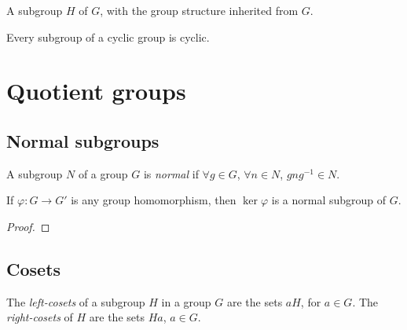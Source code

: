 \begin{definition}
  \label{def:groups:subgroup-to-group}
  \leanok
  A subgroup $H$ of $G$, with the group structure inherited from $G$.
\end{definition}

\begin{proposition}
  \label{prop:groups:subgroup-of-cyclic-is-cyclic}
  Every subgroup of a cyclic group is cyclic.
\end{proposition}

\section{Quotient groups}
\label{sec:groups:quotient-groups}

\subsection{Normal subgroups}
\label{subsec:groups:normal-subgroups}

\begin{definition}
  \label{def:groups:normal-subgroup}
  \leanok
  A subgroup $N$ of a group $G$ is \emph{normal} if $\forall g \in G$,
  $\forall n \in N$, $gng^{-1} \in N$.
\end{definition}

\begin{proposition}
  \label{prop:groups:kernel-is-normal}
  If $\varphi : G \to G'$ is any group homomorphism, then
  $\ker\varphi$ is a normal subgroup of $G$.
\end{proposition}
\begin{proof}
\end{proof}

\subsection{Cosets}
\label{subsec:groups:cosets}

\begin{definition}
  \label{def:groups:cosets}
  \leanok
  The \emph{left-cosets} of a subgroup $H$ in a group $G$ are the sets
  $aH$, for $a \in G$. The \emph{right-cosets} of $H$ are the sets
  $Ha$, $a \in G$.
\end{definition}


